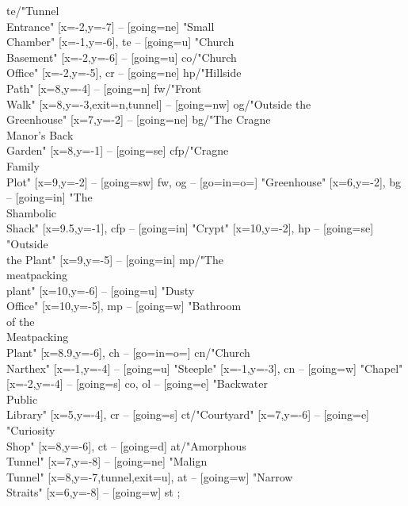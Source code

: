 \documentclass[a5paper]{extarticle}
\begin{document}
\begin{adjustbox}{max width=\linewidth}
\begin{gamemap}[set grid={10em}{6em}]
{  te/"Tunnel\\Entrance" [x=-2,y=-7] -- [going=ne]
  "Small\\Chamber" [x=-1,y=-6],
  te -- [going=u]
  "Church\\Basement" [x=-2,y=-6] -- [going=u]
  co/"Church\\Office" [x=-2,y=-5],
  cr -- [going=ne]
  hp/"Hillside\\Path" [x=8,y=-4] -- [going=n]
  fw/"Front\\Walk" [x=8,y=-3,exit=n,tunnel] -- [going=nw]
  og/"Outside the\\Greenhouse" [x=7,y=-2] -- [going=ne]
  bg/"The Cragne\\Manor's Back\\Garden" [x=8,y=-1] -- [going=se]
  cfp/"Cragne\\Family\\Plot" [x=9,y=-2] -- [going=sw]
  fw,
  og -- [go={in=\tgmWSW}{o=\tgmENE}]
  "Greenhouse" [x=6,y=-2],
  bg -- [going=in]
  "The\\Shambolic\\Shack" [x=9.5,y=-1],
  cfp -- [going=in]
  "Crypt" [x=10,y=-2],
  hp -- [going=se]
  "Outside\\the Plant" [x=9,y=-5] -- [going=in]
  mp/"The\\meatpacking\\plant" [x=10,y=-6] -- [going=u]
  "Dusty\\Office" [x=10,y=-5],
  mp -- [going=w]
  "Bathroom\\of the\\Meatpacking\\Plant" [x=8.9,y=-6],
  ch -- [go={in=\tgmWSW}{o=\tgmENE}]
  cn/"Church\\Narthex" [x=-1,y=-4] -- [going=u]
  "Steeple" [x=-1,y=-3],
  cn -- [going=w]
  "Chapel" [x=-2,y=-4] -- [going=s]
  co,
  ol -- [going=e]
  "Backwater\\Public\\Library" [x=5,y=-4],
  cr -- [going=s]
  ct/"Courtyard" [x=7,y=-6] -- [going=e]
  "Curiosity\\Shop" [x=8,y=-6],
  ct -- [going=d]
  at/"Amorphous\\Tunnel" [x=7,y=-8] -- [going=ne]
  "Malign\\Tunnel" [x=8,y=-7,tunnel,exit=u],
  at -- [going=w]
  "Narrow\\Straits" [x=6,y=-8] -- [going=w]
  st
};
\end{gamemap}
\end{adjustbox}
\end{document}
